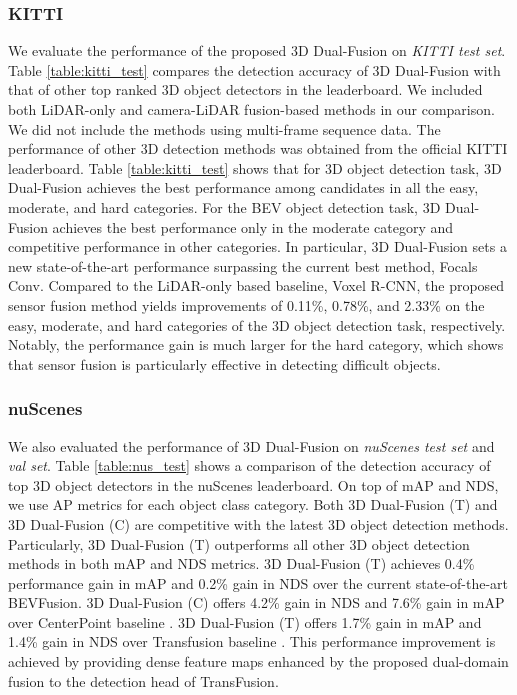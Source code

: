 \documentclass[lettersize,journal]{IEEEtran}
\begin{document}
\subsubsection{KITTI} We evaluate the performance of the proposed 3D Dual-Fusion  on {\it KITTI test set}. Table \ref{table:kitti_test} compares the detection accuracy of 3D Dual-Fusion with that of other top ranked 3D object detectors in the leaderboard. We included both  LiDAR-only and camera-LiDAR fusion-based methods in our comparison. We did not include the methods using multi-frame sequence data.  The performance of other 3D detection methods was obtained from the official KITTI leaderboard. Table \ref{table:kitti_test} shows that for 3D object detection task, 3D Dual-Fusion achieves the best performance among candidates in all the easy, moderate, and hard categories. For the BEV object detection task, 3D Dual-Fusion achieves the best performance only in the moderate category and competitive performance in other categories. In particular, 3D Dual-Fusion sets a new state-of-the-art performance surpassing the current best method, Focals Conv. Compared to  the LiDAR-only based baseline, Voxel R-CNN, the proposed sensor fusion method yields improvements of 0.11\%, 0.78\%, and 2.33\% on the easy, moderate, and hard categories of the 3D object detection task, respectively. Notably, the performance gain is much larger for the hard category, which shows that sensor fusion is particularly effective in detecting difficult objects. 



\subsubsection{nuScenes} We also evaluated the performance of 3D Dual-Fusion on {\it nuScenes test set} and {\it val set}. Table \ref{table:nus_test} shows a comparison of the detection accuracy of top 3D object detectors in the nuScenes leaderboard. On top of mAP and NDS, we use AP metrics for each object class category. Both 3D Dual-Fusion (T) and 3D Dual-Fusion (C) are competitive with the latest 3D object detection methods. Particularly, 3D Dual-Fusion (T) outperforms all other 3D object detection methods in both mAP and NDS metrics. 3D Dual-Fusion (T) achieves 0.4\%  performance gain in mAP and 0.2\% gain in NDS over the current state-of-the-art BEVFusion.  3D Dual-Fusion (C) offers 4.2\% gain in NDS and 7.6\% gain in  mAP over CenterPoint baseline \cite{centerpoint}.  3D Dual-Fusion (T) offers  1.7\% gain in mAP and 1.4\% gain in NDS over Transfusion baseline \cite{transfusion}. This performance improvement is achieved by providing dense feature maps enhanced by the proposed dual-domain fusion to the detection head of TransFusion.
\end{document}
